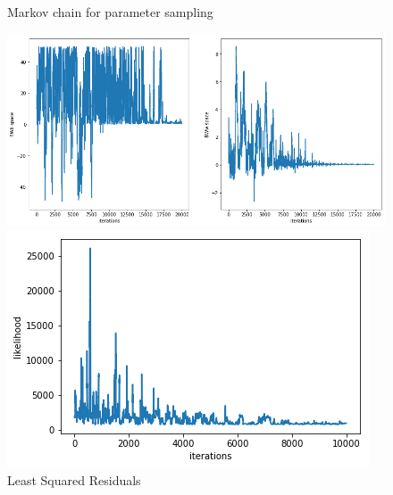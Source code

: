 \documentclass[10pt]{article}
\begin{document}
   \begin{figure}[!htb]
 \begin{minipage}{0.5\textwidth}
     \caption{Markov chain for parameter sampling}
     \centering
     \includegraphics[width=\textwidth]{imgs/mcmciter.png}
   \end{minipage}\hfill
   \begin{minipage}{0.5\textwidth}
     \caption{Least Squared Residuals}
     \centering
     \includegraphics[width=\textwidth]{imgs/mcmclike.png}
   \end{minipage}\hfill
 \end{figure}
 
\end{document}
